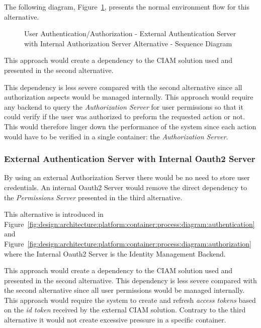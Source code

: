 The following diagram, Figure~\ref{fig:design:alternatives:auth:externalauthinternalpermission:diagram}, presents the normal environment flow for this alternative.

\begin{figure}[H]
   \centering
   \resizebox{\columnwidth}{!}
   {
      
   }
   \caption[User Authentication/Authorization - External Authentication Server with Internal Authorization Server Alternative - Sequence Diagram]{User Authentication/Authorization - External Authentication Server with Internal Authorization Server Alternative - Sequence Diagram}
   \label{fig:design:alternatives:auth:externalauthinternalpermission:diagram}
\end{figure}

This approach would create a dependency to the \gls{CIAM} solution used and presented in the second alternative.

This dependency is less severe compared with the second alternative since all authorization aspects would be managed internally.
This approach would require any backend to query the \textit{Authorization Server} for user permissions so that it could verify if the user was authorized to preform the requested action or not. This would therefore linger down the performance of the system since each action would have to be verified in a single container: the \textit{Authorization Server}.

\subsubsection{External Authentication Server with Internal Oauth2 Server}
\label{subsubsec:design:alternatives:auth:externalauthinternaloauth}

By using an external Authorization Server there would be no need to store user credentials. An internal Oauth2 Server would remove the direct dependency to the \textit{Permissions Server} presented in the third alternative.

This alternative is introduced in Figure~\ref{fig:design:architecture:platform:container:process:diagram:authentication} and Figure~\ref{fig:design:architecture:platform:container:process:diagram:authorization} where the Internal Oauth2 Server is the Identity Management Backend.

This approach would create a dependency to the \gls{CIAM} solution used and presented in the second alternative. This dependency is less severe compared with the second alternative since all user permissions would be managed internally.
This approach would require the system to create and refresh \textit{access tokens} based on the \textit{id token} received by the external \gls{CIAM} solution. Contrary to the third alternative it would not create excessive pressure in a specific container.

